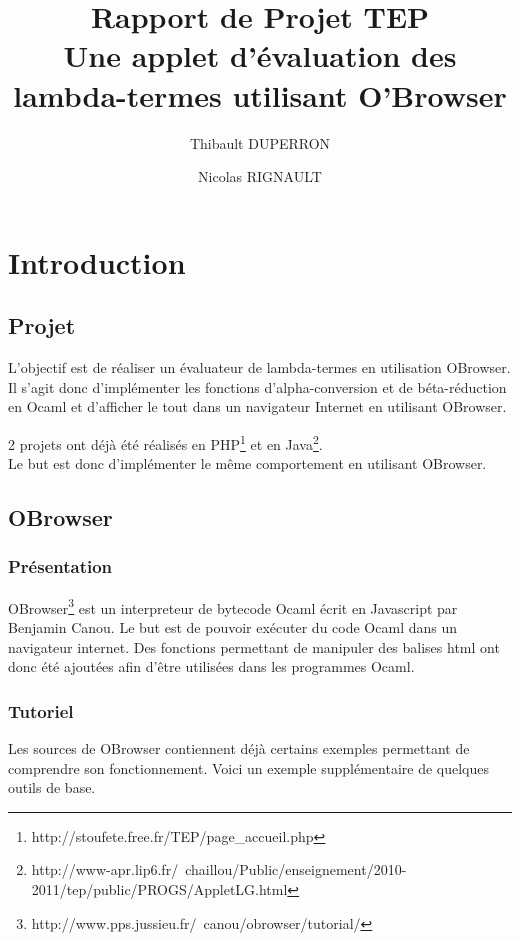 \documentclass[a4paper,11pt,titlepage]{article}
\title{Rapport de Projet TEP\\Une applet d'évaluation des lambda-termes utilisant O'Browser}
\author{Thibault DUPERRON \and Nicolas RIGNAULT}
\begin{document}
\renewcommand{\bibname}{}
\renewcommand{\refname}{}
\maketitle
\tableofcontents

\newpage
\section{Introduction}

\subsection{Projet}

L'objectif est de réaliser un évaluateur de lambda-termes en utilisation OBrowser. Il s'agit donc d'implémenter les fonctions d'alpha-conversion et de béta-réduction en Ocaml et d'afficher le tout dans un navigateur Internet en utilisant OBrowser.

2 projets ont déjà été réalisés en PHP\footnote{http://stoufete.free.fr/TEP/page\_accueil.php} et en Java\footnote{http://www-apr.lip6.fr/~chaillou/Public/enseignement/2010-2011/tep/public/PROGS/AppletLG.html}.\\

Le but est donc d'implémenter le même comportement en utilisant OBrowser.


\subsection{OBrowser}

\subsubsection{Présentation}
OBrowser\footnote{http://www.pps.jussieu.fr/~canou/obrowser/tutorial/} est un interpreteur de bytecode Ocaml écrit en Javascript par Benjamin Canou. Le but est de pouvoir exécuter du code Ocaml dans un navigateur internet. Des fonctions permettant de manipuler des balises html ont donc été ajoutées afin d'être 
utilisées dans les programmes Ocaml.

\subsubsection{Tutoriel}
Les sources de OBrowser contiennent déjà certains exemples permettant de comprendre son fonctionnement. Voici un exemple supplémentaire de quelques outils de base.\\
\end{document}
